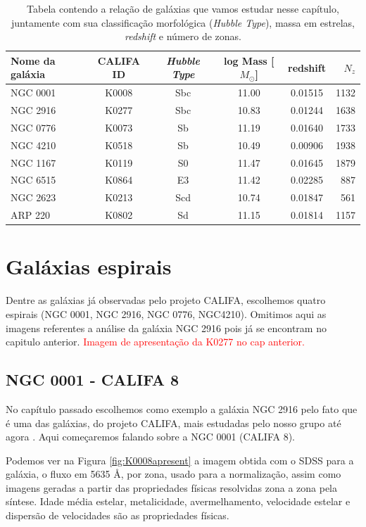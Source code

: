\begin{table}
	\caption[Relação de galáxias do CALIFA usadas neste trabalho.]
	{Tabela contendo a relação de galáxias que vamos estudar nesse capítulo, juntamente com sua classificação morfológica
	({\em Hubble Type}), massa em estrelas, {\em redshift} e número de zonas.}
	\begin{tabular}{l c c c c r}
		Nome da galáxia & CALIFA ID & {\em Hubble Type} & log Mass [$M_\odot$] & redshift & $N_z$ \\
		\midrule
		NGC 0001 & K0008 & Sbc & 11.00 & 0.01515 & 1132 \\
		NGC 2916 & K0277 & Sbc & 10.83 & 0.01244 & 1638 \\
		NGC 0776 & K0073 & Sb  & 11.19 & 0.01640 & 1733 \\
		NGC 4210 & K0518 & Sb  & 10.49 & 0.00906 & 1938 \\
		NGC 1167 & K0119 & S0  & 11.47 & 0.01645 & 1879 \\
		NGC 6515 & K0864 & E3  & 11.42 & 0.02285 & 887  \\
		NGC 2623 & K0213 & Scd & 10.74 & 0.01847 & 561  \\
		ARP 220  & K0802 & Sd  & 11.15 & 0.01814 & 1157 \\
	\end{tabular}
	\label{tab:amostraGalaxias}
\end{table}

\section{Galáxias espirais}
\label{sec:result:spirals}

Dentre as galáxias já observadas pelo projeto CALIFA, escolhemos quatro espirais (NGC 0001, NGC 2916, NGC 0776,
NGC4210). Omitimos aqui as imagens referentes a análise da galáxia NGC 2916 pois já se encontram no capitulo anterior.
\fixme \textcolor{red}{Imagem de apresentação da K0277 no cap anterior.}

\subsection{NGC 0001 - CALIFA 8}

No capítulo passado escolhemos como exemplo a galáxia NGC 2916 pelo fato que é uma das galáxias, do projeto CALIFA, mais
estudadas pelo nosso grupo até agora \citep{CidFernandes2013, CidFernandes2014}. Aqui começaremos falando sobre a NGC
0001 (CALIFA 8). 

Podemos ver na Figura \ref{fig:K0008apresent} a imagem obtida com o SDSS para a galáxia, o fluxo em 5635 \AA, por zona,
usado para a normalização, assim como imagens geradas a partir das propriedades físicas resolvidas zona a zona pela
síntese. Idade média estelar, metalicidade, avermelhamento, velocidade estelar e dispersão de velocidades são
as propriedades físicas. 

